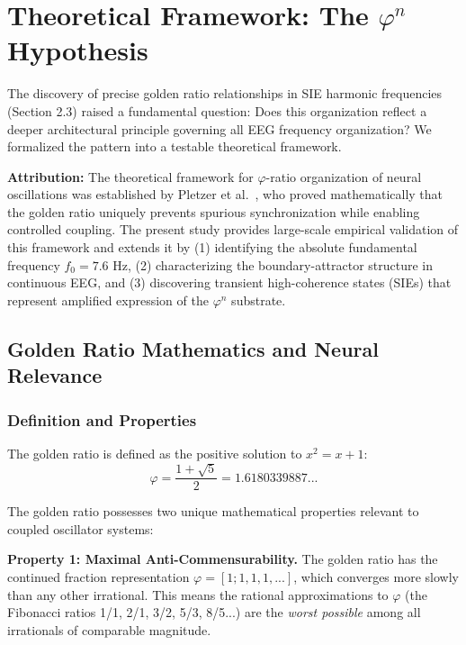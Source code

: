\documentclass[11pt,a4paper]{article}
\newcommand{\phisym}{\varphi}
\begin{document}
\section{Theoretical Framework: The $\phisym^n$ Hypothesis}

The discovery of precise golden ratio relationships in SIE harmonic frequencies (Section 2.3) raised a fundamental question: Does this organization reflect a deeper architectural principle governing all EEG frequency organization? We formalized the pattern into a testable theoretical framework.

\begin{criticalpoint}
\textbf{Attribution:} The theoretical framework for $\phisym$-ratio organization of neural oscillations was established by Pletzer et al.\ \parencite{pletzer2010golden}, who proved mathematically that the golden ratio uniquely prevents spurious synchronization while enabling controlled coupling. The present study provides large-scale empirical validation of this framework and extends it by (1) identifying the absolute fundamental frequency $f_0 = 7.6$ Hz, (2) characterizing the boundary-attractor structure in continuous EEG, and (3) discovering transient high-coherence states (SIEs) that represent amplified expression of the $\phisym^n$ substrate.
\end{criticalpoint}

\subsection{Golden Ratio Mathematics and Neural Relevance}

\subsubsection{Definition and Properties}
The golden ratio is defined as the positive solution to $x^2 = x + 1$:
\begin{equation}
\phisym = \frac{1 + \sqrt{5}}{2} = 1.6180339887...
\end{equation}

The golden ratio possesses two unique mathematical properties relevant to coupled oscillator systems:

\textbf{Property 1: Maximal Anti-Commensurability.}
The golden ratio has the continued fraction representation $\phisym = [1; 1, 1, 1, ...]$, which converges more slowly than any other irrational. This means the rational approximations to $\phisym$ (the Fibonacci ratios 1/1, 2/1, 3/2, 5/3, 8/5...) are the \textit{worst possible} among all irrationals of comparable magnitude.
\end{document}
